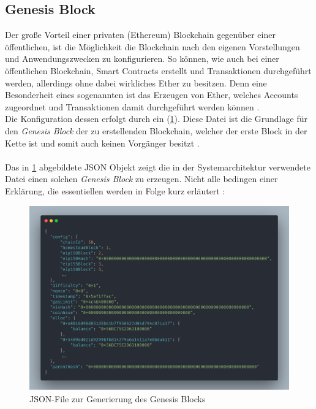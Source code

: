 \subsection{Genesis Block}
\label{subsec:genesis}
Der große Vorteil einer privaten (Ethereum) Blockchain gegenüber einer öffentlichen, ist die Möglichkeit die Blockchain nach den eigenen Vorstellungen und Anwendungszwecken zu konfigurieren. So können, wie auch bei einer öffentlichen Blockchain, Smart Contracts erstellt und Transaktionen durchgeführt werden, allerdings ohne dabei wirkliches Ether zu besitzen. Denn eine Besonderheit eines sogenannten  ist das Erzeugen von  Ether, welches Accounts zugeordnet und Transaktionen damit durchgeführt werden können \cite{Bchain:PubVsPrivate}.\\
Die Konfiguration dessen erfolgt durch ein  (\ref{img:gen}). Diese Datei ist die Grundlage für den \textit{Genesis Block} der zu erstellenden Blockchain, welcher der erste Block in der Kette ist und somit auch keinen Vorgänger besitzt \cite{MasteringBlockchain}.\\\\
Das in \ref{img:gen} abgebildete JSON Objekt zeigt die in der Systemarchitektur verwendete Datei einen solchen \textit{Genesis Block} zu erzeugen. Nicht alle  bedingen einer Erklärung, die essentiellen werden in Folge kurz erläutert \cite{MasteringBlockchain, Eth:GenFile}: 
\newpage
\begin{figure}[th!]
	\centering
	\includegraphics[width=.9\columnwidth]{./Abbildungen/Kapitel_03/genesis.json.png}
	\caption[genesis.json]{JSON-File zur Generierung des Genesis Blocks}
	\label{img:gen}
\end{figure}

